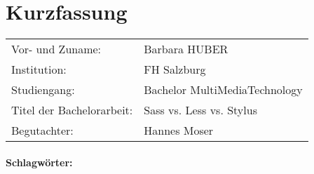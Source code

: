 \section*{Kurzfassung}
\begin{tabular}{l l}
Vor- und Zuname:& Barbara HUBER\\
Institution: & FH Salzburg\\ 
Studiengang: &  Bachelor MultiMediaTechnology\\ 
Titel der Bachelorarbeit: & Sass vs. Less vs. Stylus\\
Begutachter: & Hannes Moser\\ 
\end{tabular} 
\vspace{0.5cm}



\paragraph{Schlagwörter:}

